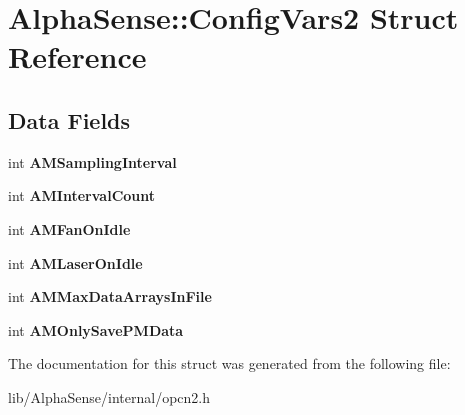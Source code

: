 \hypertarget{structAlphaSense_1_1ConfigVars2}{}\section{Alpha\+Sense\+:\+:Config\+Vars2 Struct Reference}
\label{structAlphaSense_1_1ConfigVars2}
\subsection*{Data Fields}
\begin{DoxyCompactItemize}
\item 
\mbox{\label{structAlphaSense_1_1ConfigVars2_a2a0f397681dbeb58dc382806aa5b3450}} 
int {\bfseries A\+M\+Sampling\+Interval}
\item 
\mbox{\label{structAlphaSense_1_1ConfigVars2_a57a5ae4c9927189bbf25d9765093ca17}} 
int {\bfseries A\+M\+Interval\+Count}
\item 
\mbox{\label{structAlphaSense_1_1ConfigVars2_aae32e16fe6f25094316fbec03dad0053}} 
int {\bfseries A\+M\+Fan\+On\+Idle}
\item 
\mbox{\label{structAlphaSense_1_1ConfigVars2_aafb1a0e259107e7b8b981185651d6efe}} 
int {\bfseries A\+M\+Laser\+On\+Idle}
\item 
\mbox{\label{structAlphaSense_1_1ConfigVars2_a6c4213149587ab4af9029faf20d7ef69}} 
int {\bfseries A\+M\+Max\+Data\+Arrays\+In\+File}
\item 
\mbox{\label{structAlphaSense_1_1ConfigVars2_a1981dc60149d4a4de7ff189d6c3b0aff}} 
int {\bfseries A\+M\+Only\+Save\+P\+M\+Data}
\end{DoxyCompactItemize}


The documentation for this struct was generated from the following file\+:\begin{DoxyCompactItemize}
\item 
lib/\+Alpha\+Sense/internal/opcn2.\+h\end{DoxyCompactItemize}
